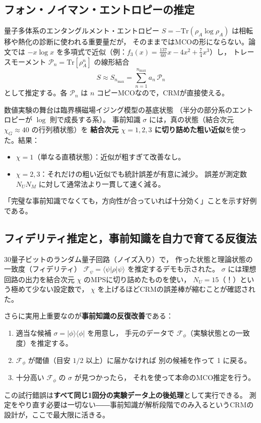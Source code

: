 \documentclass[11pt]{ltjsarticle}
\newcommand{\Tr}{\mathrm{Tr}}
\newcommand{\ket}[1]{|#1\rangle}
\newcommand{\bra}[1]{\langle#1|}
\newcommand{\ketbra}[2]{|#1\rangle\langle#2|}
\newcommand{\NU}{N_U}
\newcommand{\NM}{N_M}
\begin{document}
\subsection{フォン・ノイマン・エントロピーの推定}

量子多体系のエンタングルメント・エントロピー
$S = -\Tr(\rho_A \log \rho_A)$ は相転移や熱化の診断に使われる重要量だが，
そのままではMCOの形にならない。論文では
$-x\log x$ を多項式で近似（例：$f_3(x) = \tfrac{137}{60}x - 4x^2 + \tfrac{7}{4}x^3$）し，
トレースモーメント $\mathcal{P}_n = \Tr[\rho_A^n]$ の線形結合
\begin{equation}
  S \approx S_{n_{\max}} = \sum_{n=1}^{n_{\max}} a_n\, \mathcal{P}_n
\end{equation}
として推定する。各 $\mathcal{P}_n$ は $n$ コピーMCOなので，CRMが直接使える。

数値実験の舞台は臨界横磁場イジング模型の基底状態
（半分の部分系のエントロピーが $\log$ 則で成長する系）。
事前知識 $\sigma$ には，真の状態（結合次元 $\chi_G \approx 40$ の行列積状態）を
\textbf{結合次元 $\chi = 1, 2, 3$ に切り詰めた粗い近似}を使った。結果：
\begin{itemize}
  \item $\chi = 1$（単なる直積状態）：近似が粗すぎて改善なし。
  \item $\chi = 2, 3$：それだけの粗い近似でも統計誤差が有意に減少。
        誤差が測定数 $\NU\NM$ に対して通常法より一貫して速く減る。
\end{itemize}
「完璧な事前知識でなくても，方向性が合っていれば十分効く」ことを示す好例である。

\subsection{フィデリティ推定と，事前知識を自力で育てる反復法}

30量子ビットのランダム量子回路（ノイズ入り）で，
作った状態と理論状態の一致度（フィデリティ）
$\mathcal{F}_\psi = \bra{\psi}\rho\ket{\psi}$ を推定するデモも示された。
$\sigma$ には理想回路の出力を結合次元 $\chi$ のMPSに切り詰めたものを使い，
$\NU = 15$（！）という極めて少ない設定数で，
$\chi$ を上げるほどCRMの誤差棒が縮むことが確認された。

さらに実用上重要なのが\textbf{事前知識の反復改善}である：
\begin{enumerate}
  \item 適当な候補 $\sigma = \ketbra{\phi}{\phi}$ を用意し，
        手元のデータで $\mathcal{F}_\phi$（実験状態との一致度）を推定する。
  \item $\mathcal{F}_\phi$ が閾値（目安 $1/2$ 以上）に届かなければ
        別の候補を作って 1 に戻る。
  \item 十分高い $\mathcal{F}_\phi$ の $\sigma$ が見つかったら，
        それを使って本命のMCO推定を行う。
\end{enumerate}
この試行錯誤は\textbf{すべて同じ1回分の実験データ上の後処理}として実行できる。
測定をやり直す必要は一切ない――事前知識が解析段階でのみ入るというCRMの
設計が，ここで最大限に活きる。
\end{document}
